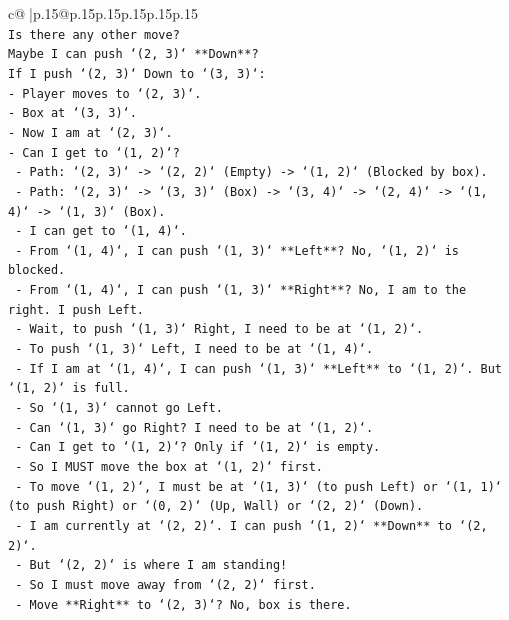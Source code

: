 \documentclass{article}
\begin{document}
{\begin{supertabular}{c@{$\;$}|p{.15\linewidth}@{}p{.15\linewidth}p{.15\linewidth}p{.15\linewidth}p{.15\linewidth}p{.15\linewidth}}
{{{\\ 
\texttt{Is there any other move?} \\
\texttt{Maybe I can push `(2, 3)` **Down**?} \\
\texttt{If I push `(2, 3)` Down to `(3, 3)`:} \\
\texttt{{-} Player moves to `(2, 3)`.} \\
\texttt{{-} Box at `(3, 3)`.} \\
\texttt{{-} Now I am at `(2, 3)`.} \\
\texttt{{-} Can I get to `(1, 2)`?} \\
\texttt{  {-} Path: `(2, 3)` {-}> `(2, 2)` (Empty) {-}> `(1, 2)` (Blocked by box).} \\
\texttt{  {-} Path: `(2, 3)` {-}> `(3, 3)` (Box) {-}> `(3, 4)` {-}> `(2, 4)` {-}> `(1, 4)` {-}> `(1, 3)` (Box).} \\
\texttt{  {-} I can get to `(1, 4)`.} \\
\texttt{  {-} From `(1, 4)`, I can push `(1, 3)` **Left**? No, `(1, 2)` is blocked.} \\
\texttt{  {-} From `(1, 4)`, I can push `(1, 3)` **Right**? No, I am to the right. I push Left.} \\
\texttt{  {-} Wait, to push `(1, 3)` Right, I need to be at `(1, 2)`.} \\
\texttt{  {-} To push `(1, 3)` Left, I need to be at `(1, 4)`.} \\
\texttt{  {-} If I am at `(1, 4)`, I can push `(1, 3)` **Left** to `(1, 2)`. But `(1, 2)` is full.} \\
\texttt{  {-} So `(1, 3)` cannot go Left.} \\
\texttt{  {-} Can `(1, 3)` go Right? I need to be at `(1, 2)`.} \\
\texttt{  {-} Can I get to `(1, 2)`? Only if `(1, 2)` is empty.} \\
\texttt{  {-} So I MUST move the box at `(1, 2)` first.} \\
\texttt{  {-} To move `(1, 2)`, I must be at `(1, 3)` (to push Left) or `(1, 1)` (to push Right) or `(0, 2)` (Up, Wall) or `(2, 2)` (Down).} \\
\texttt{  {-} I am currently at `(2, 2)`. I can push `(1, 2)` **Down** to `(2, 2)`.} \\
\texttt{  {-} But `(2, 2)` is where I am standing!} \\
\texttt{  {-} So I must move away from `(2, 2)` first.} \\
\texttt{  {-} Move **Right** to `(2, 3)`? No, box is there.} \\
}}}
\end{supertabular}}
\end{document}

